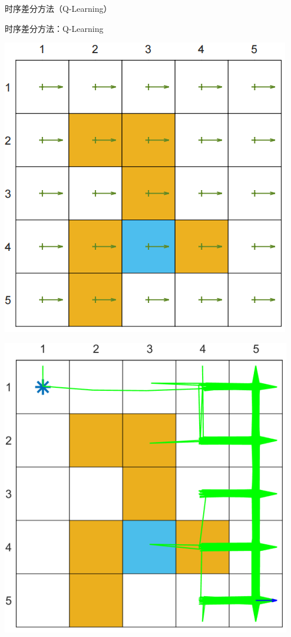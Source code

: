 \begin{section}{时序差分方法\alert{（Q-Learning）}}
\begin{frame}{时序差分方法：Q-Learning}
    \begin{center}
        \begin{minipage}{0.2\textwidth}
            \centering
            \includegraphics[width=\linewidth]{assets/e0.1policy.jpg}
        \end{minipage}
        \hspace{1cm}
        \begin{minipage}{0.2\textwidth}
            \centering
            \includegraphics[width=\linewidth]{assets/e0.1episode.jpg}

\end{minipage}
\end{center}
\end{frame}
\end{section}
